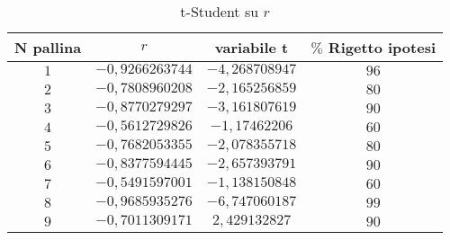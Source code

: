 \documentclass[a4paper,11pt,oneside]{article}
\begin{document}
\begin{table}[h!]
\caption{t-Student su $r$}
\label{tab:t_student}
\vspace{0.2cm}
\centering
\begin{tabular}{|c|c|c|c|}
\hline
 \textbf{N pallina} & \textbf{$r$} & \textbf{ variabile t} & \textbf{{$\%$ Rigetto ipotesi}} \\ \hline
\rowcolor[rgb]{0.85,0.85,0.85}$1$ & $-0,9266263744$ & $-4,268708947$ & $96$ \\ \hline
 $2$ & $-0,7808960208$ & $-2,165256859$ & $80$ \\ \hline
\rowcolor[rgb]{0.85,0.85,0.85}$3$ & $-0,8770279297$ & $-3,161807619$ & $90$ \\ \hline
 $4$ & $-0,5612729826$ & $-1,17462206$ & $60$ \\ \hline
\rowcolor[rgb]{0.85,0.85,0.85}$5$ & $-0,7682053355$ & $-2,078355718$ & $80$ \\ \hline
 $6$ & $-0,8377594445$ & $-2,657393791$ & $90$ \\ \hline
\rowcolor[rgb]{0.85,0.85,0.85}$7$ & $-0,5491597001$ & $-1,138150848$ & $60$ \\ \hline
 $8$ & $-0,9685935276$ & $-6,747060187$ & $99$ \\ \hline
\rowcolor[rgb]{0.85,0.85,0.85}$9$ & $-0,7011309171$ & $2,429132827$ & $90$ \\ \hline
\end{tabular}
\end{table}


\newpage%
\end{document}
